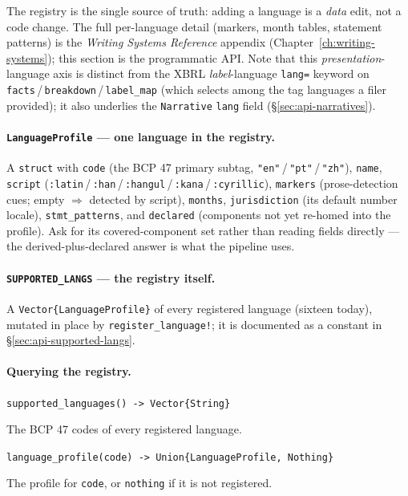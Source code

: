 \documentclass[11pt,a4paper]{report}
\newcommand{\sig}[1]{\medskip\noindent\texttt{#1}\par\medskip}
\begin{document}
\noindent The registry is the single source of truth: adding a language is a \emph{data} edit, not a code
change. The full per-language detail (markers, month tables, statement patterns) is the \emph{Writing Systems
Reference} appendix (Chapter~\ref{ch:writing-systems}); this section is the programmatic API. Note that this
\emph{presentation}-language axis is distinct from the XBRL \emph{label}-language \texttt{lang=} keyword on
\texttt{facts}\,/\,\texttt{breakdown}\,/\,\texttt{label\_map} (which selects among the tag languages a filer
provided); it also underlies the \texttt{Narrative} \texttt{lang} field (\S\ref{sec:api-narratives}).

\paragraph{\texttt{LanguageProfile} --- one language in the registry.} A \texttt{struct} with \texttt{code}
(the BCP 47 primary subtag, \texttt{"en"}\,/\,\texttt{"pt"}\,/\,\texttt{"zh"}), \texttt{name}, \texttt{script}
(\texttt{:latin}\,/\,\texttt{:han}\,/\,\texttt{:hangul}\,/\,\texttt{:kana}\,/\,\texttt{:cyrillic}),
\texttt{markers} (prose-detection cues; empty $\Rightarrow$ detected by script), \texttt{months},
\texttt{jurisdiction} (its default number locale), \texttt{stmt\_patterns}, and \texttt{declared} (components
not yet re-homed into the profile). Ask for its covered-component set rather than reading fields directly ---
the derived-plus-declared answer is what the pipeline uses.

\paragraph{\texttt{SUPPORTED\_LANGS} --- the registry itself.} A \texttt{Vector\{LanguageProfile\}} of every
registered language (sixteen today), mutated in place by \texttt{register\_language!}; it is documented as a
constant in \S\ref{sec:api-supported-langs}.

\paragraph{Querying the registry.}

\sig{supported\_languages() -> Vector\{String\}}

\noindent The BCP 47 codes of every registered language.

\sig{language\_profile(code) -> Union\{LanguageProfile, Nothing\}}

\noindent The profile for \texttt{code}, or \texttt{nothing} if it is not registered.
\end{document}
